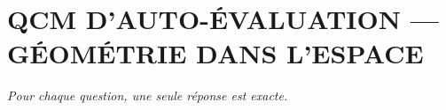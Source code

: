 
\section*{\textcolor{chapcolor}{\MakeUppercase{QCM d'auto-évaluation — Géométrie dans l'espace}}}

\begin{center}
\textit{Pour chaque question, une seule réponse est exacte.}
\end{center}

